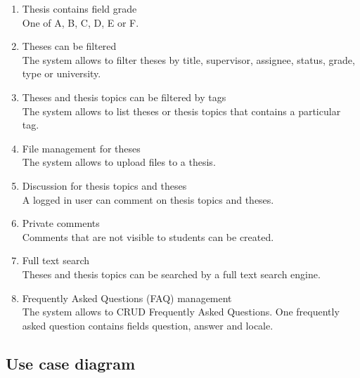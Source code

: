 \begin{enumerate}
    \item Thesis contains field grade\\
    One of A, B, C, D, E or F.

    \item Theses can be filtered\\
    The system allows to filter theses by title, supervisor, assignee, status, grade, type or university.

    \item Theses and thesis topics can be filtered by tags\\
    The system allows to list theses or thesis topics that contains a particular tag.

    \item File management for theses\\
    The system allows to upload files to a thesis.

    \item Discussion for thesis topics and theses\\
    A logged in user can comment on thesis topics and theses.

    \item Private comments\\
    Comments that are not visible to students can be created.

    \item Full text search\\
    Theses and thesis topics can be searched by a full text search engine.

    \item Frequently Asked Questions (FAQ) management\\
    The system allows to CRUD Frequently Asked Questions. One frequently asked question contains fields question, answer and locale.

\end{enumerate}

\newpage

\subsection{Use case diagram}

